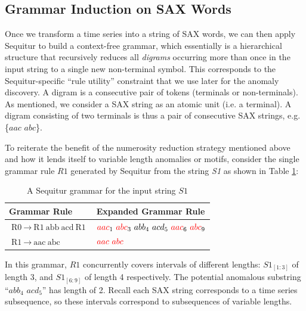 \documentclass{llncs}
\begin{document}
\subsection{Grammar Induction on SAX Words}\label{rule_utility}
Once we transform a time series into a string of SAX words, we can then apply Sequitur to build a context-free grammar, which essentially is a hierarchical structure that recursively reduces all \textit{digrams} occurring more than once in the input string to a single new non-terminal symbol. This corresponds to the Sequitur-specific ``rule utility'' constraint that we use later for the anomaly discovery. A digram is a consecutive pair of tokens (terminals or non-terminals). As mentioned, we consider a SAX string as an atomic unit (i.e. a terminal). A digram consisting of two terminals is thus a pair of consecutive SAX strings, e.g. \{$aac$ $abc$\}.

To reiterate the benefit of the numerosity reduction strategy mentioned above and how it lends itself to variable length anomalies or motifs, consider the single grammar rule $R1$ generated by Sequitur from the string \textit{S1} as shown in Table \ref{table:rulesS1}:
\begin{table}[h] 
\vspace{-0.8cm}
\caption{A Sequitur grammar for the input string $S1$} 
\vspace{0.2cm}
\centering
\begin{tabularx}{\linewidth}{X X}
\hline
Grammar Rule & Expanded Grammar Rule \\
\hline
$\text{R0}~ \rightarrow~ \text{R1}~ \text{abb}~ \text{acd}~ \text{R1}$ & $ \textcolor{red}{aac}_{1}~ \textcolor{red}{abc}_{3}~ abb_{4}~ acd_{5}~ \textcolor{red}{aac}_{6}~ \textcolor{red}{abc}_{9}$ \\ 
$\text{R1}~ \rightarrow~ \text{aac}~ \text{abc} $ & $\textcolor{red}{aac}~ \textcolor{red}{abc}$ \\


\hline
\end{tabularx}
\label{table:rulesS1} %
\vspace{-0.4cm}
\end{table} 

In this grammar, $R1$ concurrently covers intervals of different lengths: $S1_{[1:3]}$ of length 3, and $S1_{[6:9]}$ of length 4 respectively. The potential anomalous substring ``$abb_{4}$ $acd_{5}$'' has length of 2. Recall each SAX string corresponds to a time series subsequence, so these intervals correspond to subsequences of variable lengths. 
\end{document}
